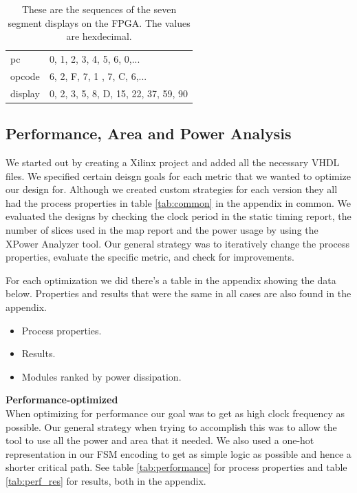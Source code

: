 \documentclass[a4paper,11pt]{article}
\begin{document}
\begin{table}[h!]
\centering
\begin{tabular}{|l|l|} \hline
  pc & 0, 1, 2, 3, 4, 5, 6, 0,...\\
  opcode & 6, 2, F, 7, 1 , 7, C, 6,... \\
  display & 0, 2, 3, 5, 8, D, 15, 22, 37, 59, 90\\ \hline
\end{tabular}
\label{tab:sequences}
\caption{These are the sequences of the seven segment displays on the FPGA. The values are hexdecimal.}
\end{table}

\newpage
\subsection{Performance, Area and Power Analysis}

We started out by creating a Xilinx project and added all the necessary VHDL files. We specified certain deisgn goals for each metric that we wanted to optimize our design for. Although we created custom strategies for each version they all had the process properties in table \ref{tab:common} in the appendix in common. We evaluated the designs by checking the clock period in the static timing report, the number of slices used in the map report and the power usage by using the XPower Analyzer tool. Our general strategy was to iteratively change the process properties, evaluate the specific metric, and check for improvements. 

For each optimization we did there's a table in the appendix showing the data below. Properties and results that were the same in all cases are also found in the appendix. 
\begin{itemize}
  \item Process properties.
  \item Results.
  \item Modules ranked by power dissipation.
\end{itemize}

\textbf{Performance-optimized} \\
When optimizing for performance our goal was to get as high clock frequency as possible. Our general strategy when trying to accomplish this was to allow the tool to use all the power and area that it needed. We also used a one-hot representation in our FSM encoding to get as simple logic as possible and hence a shorter critical path. See table \ref{tab:performance} for process properties and table \ref{tab:perf_res} for results, both in the appendix.
\end{document}

